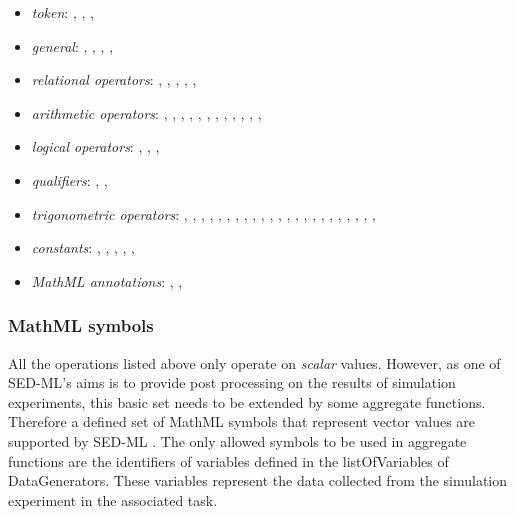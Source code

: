 \begin{itemize}\setlength{\parskip}{-0.1ex}

\item \emph{token}: , , ,
  
\item \emph{general}: , ,
  , ,  

\item \emph{relational operators}: , ,
  , , , 

\item \emph{arithmetic operators}: , ,
  , , , ,
  , , , ,
  , , 

\item \emph{logical operators}: , ,
  , 

\item \emph{qualifiers}: , ,

\item \emph{trigonometric operators}: , ,
  , , , ,
  , , , ,
  , , , ,
  , , , ,
  , , ,
  , , 

\item \emph{constants}: , ,
  , , ,

\item \emph{MathML annotations}: ,
  , 
\end{itemize}


\subsubsection{MathML symbols}
All the operations listed above only operate on \emph{scalar} values. However, as one of SED-ML's aims is to provide post processing on the results of simulation experiments, this basic set needs to be extended by some aggregate functions. Therefore a defined set of MathML symbols that represent vector values are supported by SED-ML \currentLV. The only allowed symbols to be used in aggregate functions are the identifiers of variables defined in the listOfVariables of DataGenerators. These variables represent the data collected from the simulation experiment in the associated task. 



